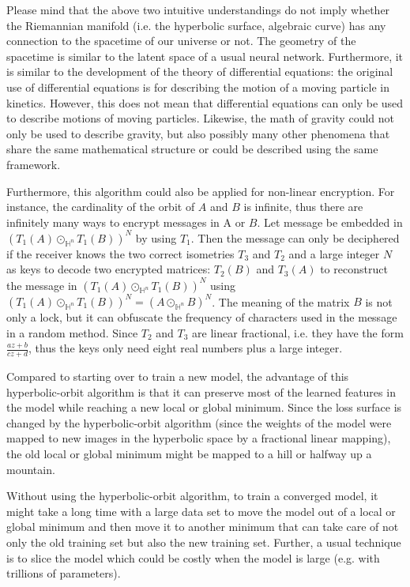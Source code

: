 \documentclass{article}
\theoremstyle{plain}
\theoremstyle{plain} %
\theoremstyle{definition}  %
\theoremstyle{remark}  %
\theoremstyle{plain}
\begin{document}
Please mind that the above two intuitive understandings do not imply whether the Riemannian manifold (i.e. the hyperbolic surface, algebraic curve) has any connection to the spacetime of our universe or not. The geometry of the spacetime is similar to the latent space of a usual neural network. Furthermore, it is similar to the development of the theory of differential equations: the original use of differential equations is for describing the motion of a moving particle in kinetics. However, this does not mean that differential equations can only be used to describe motions of moving particles. Likewise, the math of gravity could not only be used to describe gravity, but also possibly many other phenomena that share the same mathematical structure or could be described using the same framework.  

Furthermore, this algorithm could also be applied for non-linear encryption. For instance, the cardinality of the orbit of $A$ and $B$ is infinite, thus there are infinitely many ways to encrypt messages in A or $B$. Let message be embedded in $(T_1(A)\odot_{\mathbb{H}^n}T_1(B))^N$ by using $T_1$. Then the message can only be deciphered if the receiver knows the two correct isometries $T_3$ and $T_2$ and a large integer $N$ as keys to decode two encrypted matrices: $T_2(B)$ and $T_3(A)$ to reconstruct the message in $(T_1(A)\odot_{\mathbb{H}^n}T_1(B))^N$ using $(T_1(A)\odot_{\mathbb{H}^n}T_1(B))^N = (A\odot_{\mathbb{H}^n}B)^N$. The meaning of the matrix $B$ is not only a lock, but it can obfuscate the frequency of characters used in the message in a random method. Since $T_2$ and $T_3$ are linear fractional, i.e. they have the form $\frac{az+b}{cz+d}$, thus the keys only need eight real numbers plus a large integer.

Compared to starting over to train a new model, the advantage of this hyperbolic-orbit algorithm is that it can preserve most of the learned features in the model while reaching a new local or global minimum. Since the loss surface is changed by the hyperbolic-orbit algorithm (since the weights of the model were mapped to new images in the hyperbolic space by a fractional linear mapping), the old local or global minimum might be mapped to a hill or halfway up a mountain.

Without using the hyperbolic-orbit algorithm, to train a converged model, it might take a long time with a large data set to move the model out of a local or global minimum and then move it to another minimum that can take care of not only the old training set but also the new training set. Further, a usual technique is to slice the model\cite{zhang2022toward} which could be costly when the model is large (e.g. with trillions of parameters).
\end{document}
